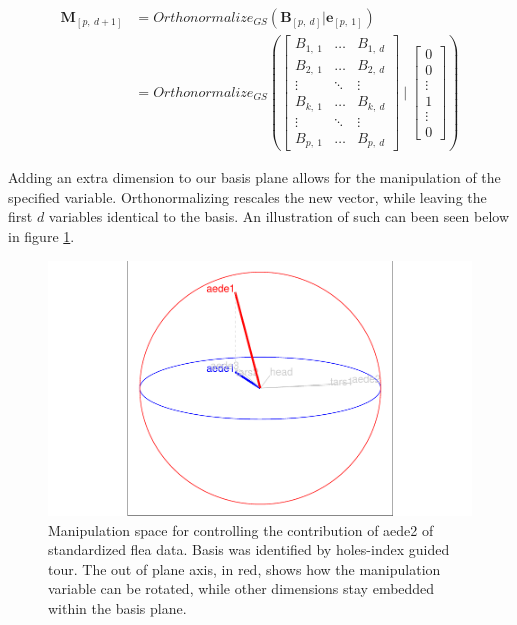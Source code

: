 \documentclass{monashthesis}
\begin{document}
\begin{align*}
  \textbf{M}_{[p,~d+1]}
  &= Orthonormalize_{GS}( \textbf{B}_{[p,~d]}|\textbf{e}_{[p,~1]} ) \\
  &= Orthonormalize_{GS}
  \left(
    \begin{bmatrix}
      B_{1,~1} & \dots  & B_{1,~d} \\
      B_{2,~1} & \dots  & B_{2,~d} \\
      \vdots   & \ddots & \vdots   \\
      B_{k,~1} & \dots  & B_{k,~d} \\
      \vdots   & \ddots & \vdots   \\
      B_{p,~1} & \dots  & B_{p,~d}
    \end{bmatrix}
  ~|~
    \begin{bmatrix}
      0 \\
      0 \\
      \vdots \\
      1 \\
      \vdots \\
      0
    \end{bmatrix}
  \right)
\end{align*}

Adding an extra dimension to our basis plane allows for the manipulation
of the specified variable. Orthonormalizing rescales the new vector,
while leaving the first \(d\) variables identical to the basis. An
illustration of such can been seen below in figure \ref{fig:step2}.

\begin{figure}

{\centering \includegraphics[width=1\linewidth]{thesis_files/figure-latex/step2-1} 

}

\caption{Manipulation space for controlling the contribution of aede2 of standardized flea data. Basis was identified by holes-index guided tour. The out of plane axis, in red, shows how the manipulation variable can be rotated, while other dimensions stay embedded within the basis plane.}\label{fig:step2}
\end{figure}
\end{document}
